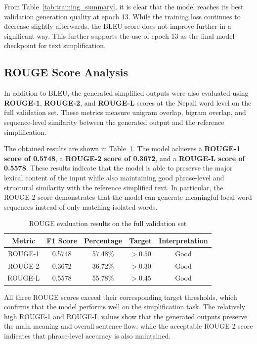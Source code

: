 \documentclass[12pt]{report}
\begin{document}
From Table~\ref{tab:training_summary}, it is clear that the model reaches its best validation generation quality at epoch 13. While the training loss continues to decrease slightly afterwards, the BLEU score does not improve further in a significant way. This further supports the use of epoch 13 as the final model checkpoint for text simplification.

\subsection{ROUGE Score Analysis}

In addition to BLEU, the generated simplified outputs were also evaluated using \textbf{ROUGE-1}, \textbf{ROUGE-2}, and \textbf{ROUGE-L} scores at the Nepali word level on the full validation set. These metrics measure unigram overlap, bigram overlap, and sequence-level similarity between the generated output and the reference simplification.

The obtained results are shown in Table~\ref{tab:rouge_results}. The model achieves a \textbf{ROUGE-1 score of 0.5748}, a \textbf{ROUGE-2 score of 0.3672}, and a \textbf{ROUGE-L score of 0.5578}. These results indicate that the model is able to preserve the major lexical content of the input while also maintaining good phrase-level and structural similarity with the reference simplified text. In particular, the ROUGE-2 score demonstrates that the model can generate meaningful local word sequences instead of only matching isolated words.

\begin{table}[H]
\centering
\caption{ROUGE evaluation results on the full validation set}
\label{tab:rouge_results}
\small
\begin{tabular}{ccccc}
\toprule
\textbf{Metric} & \textbf{F1 Score} & \textbf{Percentage} & \textbf{Target} & \textbf{Interpretation} \\
\midrule
ROUGE-1 & 0.5748 & 57.48\% & $> 0.50$ & Good \\
ROUGE-2 & 0.3672 & 36.72\% & $> 0.30$ & Good \\
ROUGE-L & 0.5578 & 55.78\% & $> 0.45$ & Good \\
\bottomrule
\end{tabular}
\end{table}

All three ROUGE scores exceed their corresponding target thresholds, which confirms that the model performs well on the simplification task. The relatively high ROUGE-1 and ROUGE-L values show that the generated outputs preserve the main meaning and overall sentence flow, while the acceptable ROUGE-2 score indicates that phrase-level accuracy is also maintained.
\end{document}
